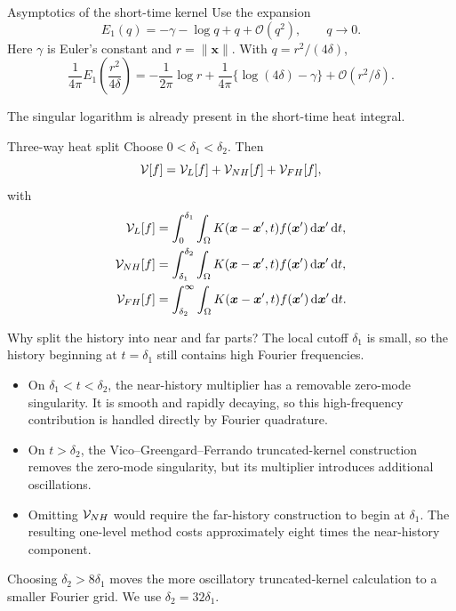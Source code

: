 \documentclass[aspectratio=169,11pt]{beamer}
\newcommand{\cO}{\mathcal{O}}
\newcommand{\dd}{\,\mathrm d}
\newcommand{\x}{\bm{x}}
\newcommand{\xp}{\bm{x}'}
\begin{document}
\begin{frame}{Asymptotics of the short-time kernel}
\small
Use the expansion
\[
  E_1(q)=-\gamma-\log q+q+\cO(q^2),
  \qquad q\to0.
\]
Here $\gamma$ is Euler's constant and $r=\|\x\|$.
With $q=r^2/(4\delta)$,
\[
  \frac{1}{4\pi}E_1\!\left(\frac{r^2}{4\delta}\right)
  =
  -\frac{1}{2\pi}\log r
  +
  \frac{1}{4\pi}\{\log(4\delta)-\gamma\}
  +\cO(r^2/\delta).
\]

The singular logarithm is already present in the short-time heat integral.
\end{frame}

\begin{frame}{Three-way heat split}
\small
Choose $0<\delta_1<\delta_2$. Then
\[
  \mathcal{V}[f]=\mathcal{V}_L[f]+\mathcal{V}_{NH}[f]+\mathcal{V}_{FH}[f],
\]
with
\[
\begin{aligned}
  \Vop_L[f]  &=\int_0^{\delta_1}\int_{\Omega}K(\x-\xp,t)f(\xp)\dd\xp\dd t,\\
  \Vop_{NH}[f]&=\int_{\delta_1}^{\delta_2}\int_{\Omega}K(\x-\xp,t)f(\xp)\dd\xp\dd t,\\
  \Vop_{FH}[f]&=\int_{\delta_2}^{\infty}\int_{\Omega}K(\x-\xp,t)f(\xp)\dd\xp\dd t.
\end{aligned}
\]
\end{frame}

\begin{frame}{Why split the history into near and far parts?}
\small
The local cutoff $\delta_1$ is small, so the history beginning at
$t=\delta_1$ still contains high Fourier frequencies.

\begin{itemize}
  \item On $\delta_1<t<\delta_2$, the near-history multiplier has a
  removable zero-mode singularity.  It is smooth and rapidly decaying, so
  this high-frequency contribution is handled directly by Fourier quadrature.

  \item On $t>\delta_2$, the Vico--Greengard--Ferrando truncated-kernel
  construction removes the zero-mode singularity, but its multiplier
  introduces additional oscillations.

  \item Omitting $\mathcal{V}_{NH}$ would require the far-history construction to
  begin at $\delta_1$.  The resulting one-level method costs approximately
  eight times the near-history component.
\end{itemize}

Choosing $\delta_2>8\delta_1$ moves the more oscillatory truncated-kernel
calculation to a smaller Fourier grid.  We use $\delta_2=32\delta_1$.
\end{frame}
\end{document}
